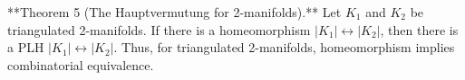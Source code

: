 **Theorem 5 (The Hauptvermutung for 2-manifolds).** Let $K_1$ and $K_2$ be triangulated 2-manifolds. If there is a homeomorphism $|K_1| \leftrightarrow |K_2|$, then there is a PLH $|K_1| \leftrightarrow |K_2|$. Thus, for triangulated 2-manifolds, homeomorphism implies combinatorial equivalence.
